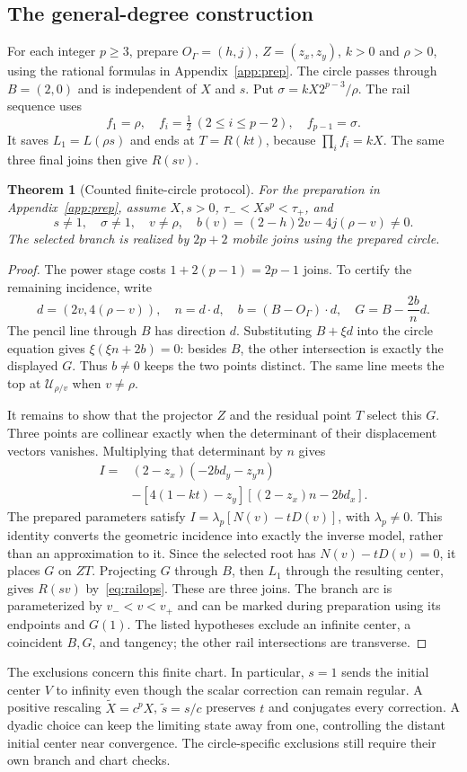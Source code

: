 \documentclass[11pt,a4paper]{article}
\newtheorem{theorem}{Theorem}[section]\newtheorem{proposition}[theorem]{Proposition}
\newcommand{\hub}[1]{\mathcal U_{#1}}
\begin{document}
\clearpage
\subsection{The general-degree construction}\label{sec:generalcircle}
For each integer $p\ge3$, prepare $O_\Gamma=(h,j)$, $Z=(z_x,z_y)$, $k>0$ and $\rho>0$, using the rational formulas in Appendix~\ref{app:prep}. The circle passes through $B=(2,0)$ and is independent of $X$ and $s$. Put $\sigma=kX2^{p-3}/\rho$. The rail sequence uses
\[
 f_1=\rho,\quad f_i=\tfrac12\ (2\le i\le p-2),\quad f_{p-1}=\sigma.
\]
It saves $L_1=L(\rho s)$ and ends at $T=R(kt)$, because $\prod_i f_i=kX$. The same three final joins then give $R(sv)$.

\begin{theorem}[Counted finite-circle protocol]\label{thm:construction}
For the preparation in Appendix~\ref{app:prep}, assume $X,s>0$, $\tau_-<Xs^p<\tau_+$, and
\[
 s\ne1,\quad \sigma\ne1,\quad v\ne\rho,\quad
 b(v)=(2-h)2v-4j(\rho-v)\ne0.
\]
The selected branch is realized by $2p+2$ mobile joins using the prepared circle.
\end{theorem}
\begin{proof}
The power stage costs $1+2(p-1)=2p-1$ joins. To certify the remaining incidence, write
\[
 d=(2v,4(\rho-v)),\quad n=d\cdot d,\quad b=(B-O_\Gamma)\cdot d,
 \quad G=B-\frac{2b}{n}d.
\]
The pencil line through $B$ has direction $d$. Substituting $B+\xi d$ into the circle equation gives $\xi(\xi n+2b)=0$: besides $B$, the other intersection is exactly the displayed $G$. Thus $b\ne0$ keeps the two points distinct. The same line meets the top at $\hub{\rho/v}$ when $v\ne\rho$.

It remains to show that the projector $Z$ and the residual point $T$ select this $G$. Three points are collinear exactly when the determinant of their displacement vectors vanishes. Multiplying that determinant by $n$ gives
\begin{align*}
 I={}&(2-z_x)(-2bd_y-z_yn)\\
 &-[4(1-kt)-z_y][(2-z_x)n-2bd_x].
\end{align*}
The prepared parameters satisfy $I=\lambda_p[N(v)-tD(v)]$, with $\lambda_p\ne0$. This identity converts the geometric incidence into exactly the inverse model, rather than an approximation to it. Since the selected root has $N(v)-tD(v)=0$, it places $G$ on $ZT$. Projecting $G$ through $B$, then $L_1$ through the resulting center, gives $R(sv)$ by~\eqref{eq:railops}. These are three joins. The branch arc is parameterized by $v_-<v<v_+$ and can be marked during preparation using its endpoints and $G(1)$. The listed hypotheses exclude an infinite center, a coincident $B,G$, and tangency; the other rail intersections are transverse.
\end{proof}
The exclusions concern this finite chart. In particular, $s=1$ sends the initial center $V$ to infinity even though the scalar correction can remain regular. A positive rescaling $\widetilde X=c^pX$, $\widetilde s=s/c$ preserves $t$ and conjugates every correction. A dyadic choice can keep the limiting state away from one, controlling the distant initial center near convergence. The circle-specific exclusions still require their own branch and chart checks.
\end{document}
